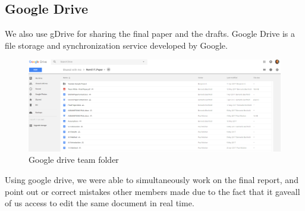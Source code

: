 \subsection{Google Drive}
We also use gDrive for sharing the final paper and the drafts.
Google Drive is a file storage and synchronization service developed by Google.

\begin{figure}[h]
	\centering
	\caption{Google drive team folder}
	\includegraphics[width=\textwidth]{images/gdrive.png}
\end{figure}
Using google drive, we were able to simultaneously work on the final report, and point out or correct mistakes other members made due to the fact that it gaveall of us access to edit the same document in real time.